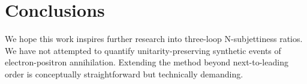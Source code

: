 \section{Conclusions}\label{sec:conclusions}

We hope this work inspires further research into three-loop
N-subjettiness ratios. We have not attempted to quantify
unitarity-preserving synthetic events of electron-positron annihilation.
Extending the method beyond next-to-leading order is conceptually
straightforward but technically demanding.

